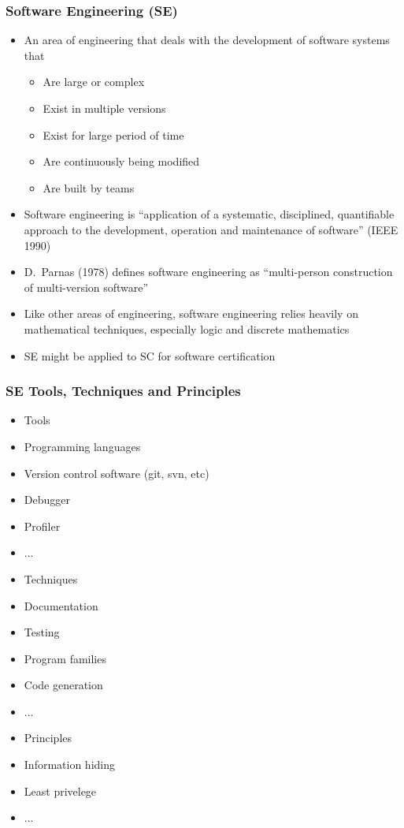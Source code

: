 \documentclass[t,12pt,numbers,fleqn]{beamer}
\begin{document}
\begin{frame}
\frametitle{Software Engineering (SE)}

\begin{itemize}
\item An area of engineering that deals with the development of software systems that
\begin{itemize}
\item Are large or complex
\item Exist in multiple versions
\item Exist for large period of time
\item Are continuously being modified
\item Are built by teams
\end{itemize}
\item Software engineering is ``application of a systematic, disciplined, quantifiable approach to the development,
operation and maintenance of software'' (IEEE 1990)
\item D.\ Parnas (1978) defines software engineering as ``multi-person construction of multi-version software''
\item Like other areas of engineering, software engineering relies heavily on mathematical techniques, especially
logic and discrete mathematics
\item SE might be applied to SC for software certification
\end{itemize}

\end{frame}


\begin{frame}
\frametitle{SE Tools, Techniques and Principles}

\begin{itemize}
\item Tools
\bi
\item Programming languages
\item Version control software (git, svn, etc)
\item Debugger
\item Profiler
\item ...
\ei
\item Techniques
\bi
\item Documentation
\item Testing
\item Program families
\item Code generation
\item ...
\ei
\item Principles
\bi
\item Information hiding
\item Least privelege
\item ...
\ei
\end{itemize}

\end{frame}
\end{document}
